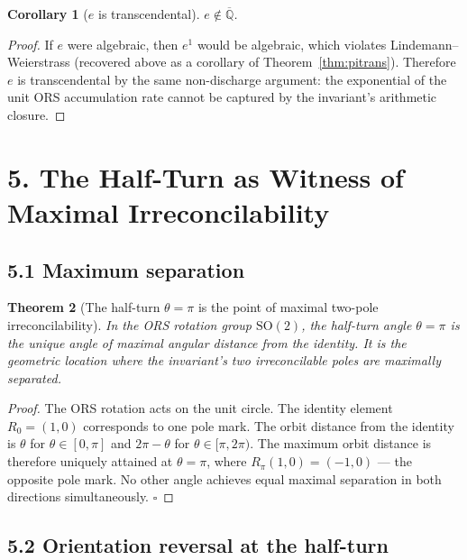 \documentclass[11pt]{article}
\newtheorem{theorem}{Theorem}[section]
\newtheorem{corollary}[theorem]{Corollary}
\theoremstyle{definition}
\theoremstyle{remark}
\begin{document}
\begin{corollary}[$e$ is transcendental]
$e\notin\overline{\mathbb{Q}}$.
\end{corollary}

\begin{proof}
If $e$ were algebraic, then $e^1$ would be algebraic, which violates
Lindemann--Weierstrass (recovered above as a corollary of
Theorem~\ref{thm:pitrans}). Therefore $e$ is transcendental by the
same non-discharge argument: the exponential of the unit ORS
accumulation rate cannot be captured by the invariant's arithmetic
closure.
\end{proof}

\section{5. The Half-Turn as Witness of Maximal Irreconcilability}

\subsection{5.1 Maximum separation}

\begin{theorem}[The half-turn $\theta=\pi$ is the point of maximal
two-pole irreconcilability]\label{thm:halfturn}
In the ORS rotation group $\mathrm{SO}(2)$, the half-turn angle
$\theta=\pi$ is the unique angle of maximal angular distance from the
identity. It is the geometric location where the invariant's two
irreconcilable poles are maximally separated.
\end{theorem}

\begin{proof}
The ORS rotation acts on the unit circle. The identity element
$R_0=(1,0)$ corresponds to one pole mark. The orbit distance from the
identity is $\theta$ for $\theta\in[0,\pi]$ and $2\pi-\theta$ for
$\theta\in[\pi,2\pi)$. The maximum orbit distance is therefore uniquely
attained at $\theta=\pi$, where $R_\pi(1,0)=(-1,0)$ --- the opposite
pole mark. No other angle achieves equal maximal separation in both
directions simultaneously. $\square$
\end{proof}

\subsection{5.2 Orientation reversal at the half-turn}
\end{document}
